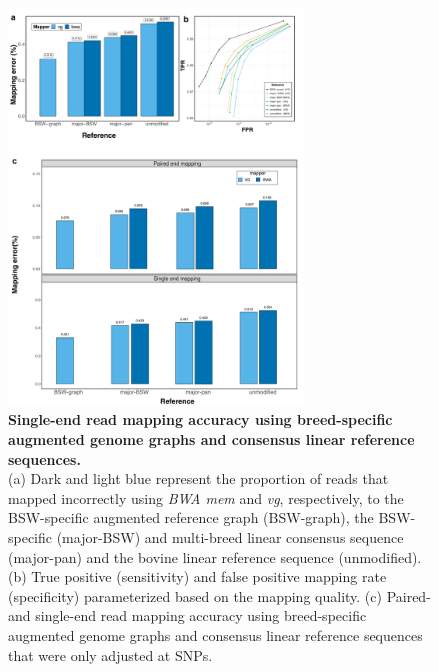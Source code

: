 \documentclass[../main.tex]{subfiles}
\begin{document}
\begin{flushleft}
\begin{figure}[!htb]
    \centering
    \includegraphics[width=0.7\textwidth]{paper2/supplement/sp313.pdf}
    \caption[ Single-end read mapping to consensus genome]{\textbf{Single-end read mapping accuracy using breed-specific
    augmented genome graphs and consensus linear reference sequences.} \\
    \small{(a) Dark and light blue represent the proportion of reads that mapped incorrectly
    using \emph{BWA mem} and \emph{vg}, respectively, to the BSW-specific augmented reference
    graph (BSW-graph), the BSW-specific (major-BSW) and multi-breed linear
    consensus sequence (major-pan) and the bovine linear reference sequence
    (unmodified). (b) True positive (sensitivity) and false positive mapping rate
    (specificity) parameterized based on the mapping quality. (c) Paired- and single-end
    read mapping accuracy using breed-specific augmented genome graphs and
    consensus linear reference sequences that were only adjusted at SNPs.}}
    \label{sup_fig:s313}
\end{figure}


\end{flushleft}
\end{document}

